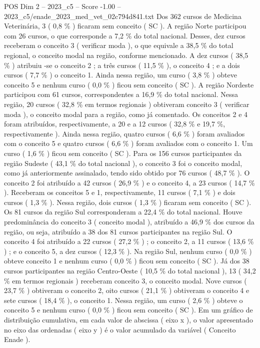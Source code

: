 \begin{textsample}{POS Dim 2 – 2023\_c5 – Score -1.00 – 2023\_c5/enade\_2023\_med\_vet\_02c794d841.txt}
Dos 362 cursos de Medicina Veterinária, 3 ( 0,8 \% ) ficaram sem conceito ( SC ).
A região Norte participou com 26 cursos, o que corresponde a 7,2 \% do total nacional.
Desses, dez cursos receberam o conceito 3 ( verificar moda ), o que equivale a 38,5 \% do total regional, o conceito modal na região, conforme mencionado.
A dez cursos ( 38,5 \% ) atribuiu -se o conceito 2 ; a três cursos ( 11,5 \% ), o conceito 4 ; e a dois cursos ( 7,7 \% ) o conceito 1.
Ainda nessa região, um curso ( 3,8 \% ) obteve conceito 5 e nenhum curso ( 0,0 \% ) ficou sem conceito ( SC ).
A região Nordeste participou com 61 cursos, correspondentes a 16,9 \% do total nacional.
Nessa região, 20 cursos ( 32,8 \% em termos regionais ) obtiveram conceito 3 ( verificar moda ), o conceito modal para a região, como já comentado.
Os conceitos 2 e 4 foram atribuídos, respectivamente, a 20 e a 12 cursos ( 32,8 \% e 19,7 \%, respectivamente ).
Ainda nessa região, quatro cursos ( 6,6 \% ) foram avaliados com o conceito 5 e quatro cursos ( 6,6 \% ) foram avaliados com o conceito 1.
Um curso ( 1,6 \% ) ficou sem conceito ( SC ).
Para os 156 cursos participantes da região Sudeste ( 43,1 \% do total nacional ), o conceito 3 foi o conceito modal, como já anteriormente assinalado, tendo sido obtido por 76 cursos ( 48,7 \% ).
O conceito 2 foi atribuído a 42 cursos ( 26,9 \% ) e o conceito 4, a 23 cursos ( 14,7 \% ).
Receberam os conceitos 5 e 1, respectivamente, 11 cursos ( 7,1 \% ) e dois cursos ( 1,3 \% ).
Nessa região, dois cursos ( 1,3 \% ) ficaram sem conceito ( SC ).
Os 81 cursos da região Sul corresponderam a 22,4 \% do total nacional.
Houve predominância do conceito 3 ( conceito modal ), atribuído a 46,9 \% dos cursos da região, ou seja, atribuído a 38 dos 81 cursos participantes na região Sul.
O conceito 4 foi atribuído a 22 cursos ( 27,2 \% ) ; o conceito 2, a 11 cursos ( 13,6 \% ) ; e o conceito 5, a dez cursos ( 12,3 \% ).
Na região Sul, nenhum curso ( 0,0 \% ) obteve conceito 1 e nenhum curso ( 0,0 \% ) ficou sem conceito ( SC ).
Já dos 38 cursos participantes na região Centro-Oeste ( 10,5 \% do total nacional ), 13 ( 34,2 \% em termos regionais ) receberam conceito 3, o conceito modal.
Nove cursos ( 23,7 \% ) obtiveram o conceito 2, oito cursos ( 21,1 \% ) obtiveram o conceito 4 e sete cursos ( 18,4 \% ), o conceito 1.
Nessa região, um curso ( 2,6 \% ) obteve o conceito 5 e nenhum curso ( 0,0 \% ) ficou sem conceito ( SC ).
Em um gráfico de distribuição cumulativa, em cada valor de abscissa ( eixo x ), o valor apresentado no eixo das ordenadas ( eixo y ) é o valor acumulado da variável ( Conceito Enade ).

\end{textsample}
